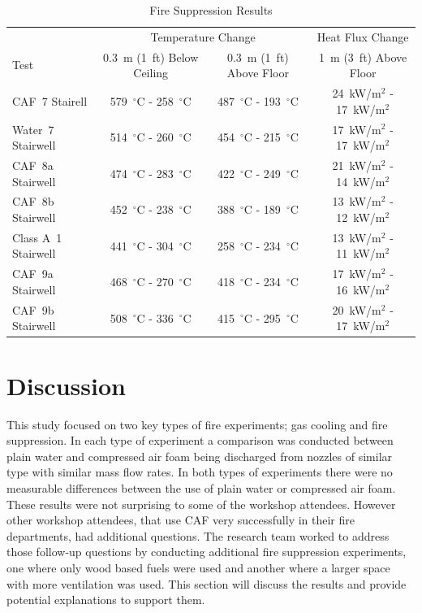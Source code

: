 \documentclass[12pt,oneside]{book}
\begin{document}
\begin{table}[!ht]
\centering
\caption{Fire Suppression Results}\label{tab:Test_Results_2}
\begin{tabular}{lccc}
\toprule[1.5pt]
                     & \multicolumn{2}{c}{Temperature Change}                                    & Heat Flux Change \\
Test 	             & 0.3~m (1~ft) Below Ceiling          & 0.3~m (1~ft) Above Floor	         & 1~m (3~ft) Above Floor \\
\midrule
CAF~7 Stairell       & 579~$^{\circ}$C - 258~$^{\circ}$C   & 487~$^{\circ}$C - 193~$^{\circ}$C   & 24~kW/m$^2$ - 17~kW/m$^2$  \\[.25cm]
Water~7 Stairwell    & 514~$^{\circ}$C - 260~$^{\circ}$C   & 454~$^{\circ}$C - 215~$^{\circ}$C   & 17~kW/m$^2$ - 17~kW/m$^2$  \\[.25cm]
CAF~8a Stairwell     & 474~$^{\circ}$C - 283~$^{\circ}$C   & 422~$^{\circ}$C - 249~$^{\circ}$C   & 21~kW/m$^2$ - 14~kW/m$^2$  \\
CAF~8b Stairwell     & 452~$^{\circ}$C - 238~$^{\circ}$C   & 388~$^{\circ}$C - 189~$^{\circ}$C   & 13~kW/m$^2$ - 12~kW/m$^2$  \\[.25cm]
Class A~1 Stairwell  & 441~$^{\circ}$C - 304~$^{\circ}$C   & 258~$^{\circ}$C - 234~$^{\circ}$C   & 13~kW/m$^2$ - 11~kW/m$^2$  \\
CAF~9a Stairwell     & 468~$^{\circ}$C - 270~$^{\circ}$C   & 418~$^{\circ}$C - 234~$^{\circ}$C   & 17~kW/m$^2$ - 16~kW/m$^2$  \\
CAF~9b Stairwell     & 508~$^{\circ}$C - 336~$^{\circ}$C   & 415~$^{\circ}$C - 295~$^{\circ}$C   & 20~kW/m$^2$ - 17~kW/m$^2$  \\
\bottomrule[1.25pt]
\end{tabular}\par
\end{table}


\chapter{Discussion}
\label{chap:Discussion}

This study focused on two key types of fire experiments; gas cooling and fire suppression. In each type of experiment a comparison was conducted between plain water and compressed air foam being discharged from nozzles of similar type with similar mass flow rates.  In both types of experiments there were no measurable differences between the use of plain water or compressed air foam. These results were not surprising to some of the workshop attendees.  However other workshop attendees, that use CAF very successfully in their fire departments, had additional questions. The research team worked to address those follow-up questions by conducting additional fire suppression experiments, one where only wood based fuels were used and another where a larger space with more ventilation was used.  This section will discuss the results and provide potential explanations to support them.
\end{document}
